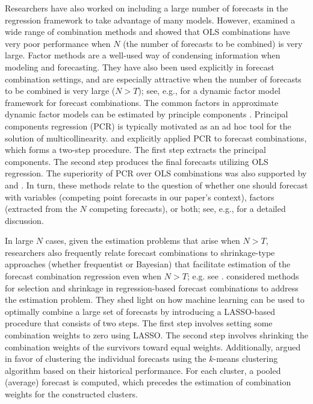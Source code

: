 \documentclass[a4paper,11pt]{article}
\begin{document}
Researchers have also worked on including a large number of forecasts in the regression framework to take advantage of many models. However, \citet{Chan1999-io} examined a wide range of combination methods and showed that OLS combinations have very poor performance when $N$ (the number of forecasts to be combined) is very large. Factor methods are a well-used way of condensing information when modeling and forecasting. They have also been used explicitly in forecast combination settings, and are especially attractive when the number of forecasts to be combined is very large ($N > T$); see, e.g., \citet{Chan1999-io} for a dynamic factor model framework for forecast combinations. The common factors in approximate dynamic factor models can be estimated by principle components \citep{Stock1999-fi}. Principal components regression (PCR) is typically motivated as an ad hoc tool for the solution of multicollinearity. \citet{Chan1999-io} and \citet{Stock2004-rq} explicitly applied PCR to forecast combinations, which forms a two-step procedure. The first step extracts the principal components. The second step produces the final forecasts utilizing OLS regression. The superiority of PCR over OLS combinations was also supported by \citet{Rapach2008-jh} and \citet{Poncela2011-vz}. In turn, these methods relate to the question of whether one should forecast with variables (competing point forecasts in our paper's context), factors (extracted from the $N$ competing forecasts), or both; see, e.g., \citet{Castle2013-fv} for a detailed discussion.

In large $N$ cases, given the estimation problems that arise when $N > T$, researchers also frequently relate forecast combinations to shrinkage-type approaches (whether frequentist or Bayesian) that facilitate estimation of the forecast combination regression even when $N > T$; e.g. see \citet{Stock2004-rq}. \citet{Diebold2019-ml} considered methods for selection and shrinkage in regression-based forecast combinations to address the estimation problem. They shed light on how machine learning can be used to optimally combine a large set of forecasts by introducing a LASSO-based procedure that consists of two steps. The first step involves setting some combination weights to zero using LASSO. The second step involves shrinking the combination weights of the survivors toward equal weights. Additionally, \citet{Aiolfi2006-rh} argued in favor of clustering the individual forecasts using the $k$-means clustering algorithm based on their historical performance. For each cluster, a pooled (average) forecast is computed, which precedes the estimation of combination weights for the constructed clusters.
\end{document}
